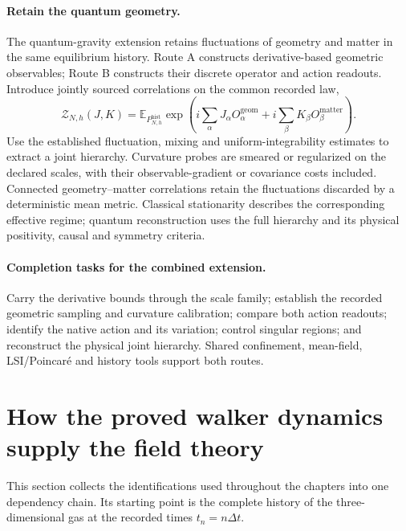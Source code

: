 \documentclass[11pt,a4paper]{article}
\begin{document}
\paragraph{Retain the quantum geometry.}
The quantum-gravity extension retains fluctuations of geometry and matter in
the same equilibrium history. Route A constructs derivative-based geometric
observables; Route B constructs their discrete operator and action readouts.
Introduce jointly sourced correlations on the common recorded law,
\[
\mathcal Z_{N,h}(J,K)=\mathbb E_{P_{N,h}^{\mathrm{hist}}}
 \exp\!\left(i\sum_\alpha J_\alpha O^{\mathrm{geom}}_\alpha
             +i\sum_\beta K_\beta O^{\mathrm{matter}}_\beta\right).
\]
Use the established fluctuation, mixing and uniform-integrability estimates
to extract a joint hierarchy. Curvature probes are smeared or regularized on
the declared scales, with their observable-gradient or covariance costs
included. Connected geometry--matter correlations retain the fluctuations
discarded by a deterministic mean metric. Classical stationarity describes
the corresponding effective regime; quantum reconstruction uses the full
hierarchy and its physical positivity, causal and symmetry criteria.

\paragraph{Completion tasks for the combined extension.}
Carry the derivative bounds through the scale family; establish the recorded
geometric sampling and curvature calibration; compare both action readouts;
identify the native action and its variation; control singular regions; and
reconstruct the physical joint hierarchy. Shared confinement, mean-field,
LSI/Poincar\'e and history tools support both routes.

\clearpage
\section{How the proved walker dynamics supply the field theory}
This section collects the identifications used throughout the chapters into one dependency chain. Its starting point is the complete history of the three-dimensional gas at the recorded times \(t_n=n\Delta t\).
\end{document}
